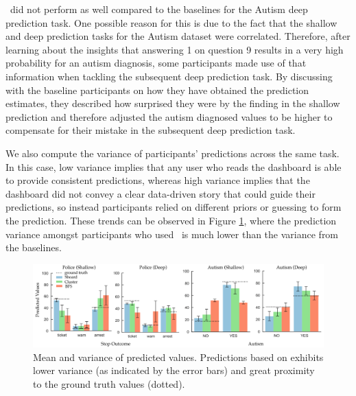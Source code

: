 \par \system\ did not perform as well compared to the baselines for the Autism deep prediction task. One possible reason for this is due to the fact that the shallow and deep prediction tasks for the Autism dataset were correlated. Therefore, after learning about the insights that answering 1 on question 9 results in a very high probability for an autism diagnosis, some participants made use of that information when tackling the subsequent deep prediction task. By discussing with the baseline participants on how they have obtained the prediction estimates, they described how surprised they were by the finding in the shallow prediction and therefore adjusted the autism diagnosed values to be higher to compensate for their mistake in the subsequent deep prediction task.
\par We also compute the variance of participants' predictions across the same task. In this case, low variance implies that any user who reads the dashboard is able to provide consistent predictions, whereas high variance implies that the dashboard did not convey a clear data-driven story that could guide their predictions, so instead participants relied on different priors or guessing to form the prediction. These trends can be observed in Figure \ref{fig:actual_predictions}, where the prediction variance amongst participants who used \system\ is much lower than the variance from the baselines.

\begin{figure}[h!]
\centering
\includegraphics[width=\linewidth]{figures/Prediction_Actual.png}
\caption{Mean and variance of predicted values. Predictions based on \system exhibits lower variance (as indicated by the error bars) and great proximity to the ground truth values (dotted).}
\label{fig:actual_predictions}
\end{figure}
